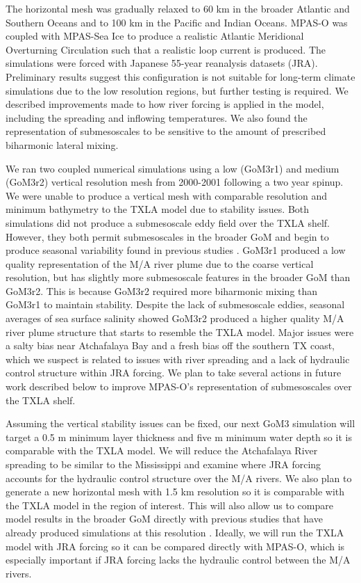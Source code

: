 The horizontal mesh was gradually relaxed to 60 km in the broader Atlantic and Southern Oceans and to 100 km in the Pacific and Indian Oceans. MPAS-O was coupled with MPAS-Sea Ice to produce a realistic Atlantic Meridional Overturning Circulation such that a realistic loop current is produced. The simulations were forced with Japanese 55-year reanalysis datasets (JRA). Preliminary results suggest this configuration is not suitable for long-term climate simulations due to the low resolution regions, but further testing is required. We described improvements made to how river forcing is applied in the model, including the spreading and inflowing temperatures. We also found the representation of submesoscales to be sensitive to the amount of prescribed biharmonic lateral mixing. 

We ran two coupled numerical simulations using a low (GoM3r1) and medium (GoM3r2) vertical resolution mesh from 2000-2001 following a two year spinup. We were unable to produce a vertical mesh with comparable resolution and minimum bathymetry to the TXLA model due to stability issues. Both simulations did not produce a submesoscale eddy field over the TXLA shelf. However, they both permit submesoscales in the broader GoM and begin to produce seasonal variability found in previous studies \citep{Barkan_2017, liu2021submesoscale}. GoM3r1 produced a low quality representation of the M/A river plume due to the coarse vertical resolution, but has slightly more submesoscale features in the broader GoM than GoM3r2. This is because GoM3r2 required more biharmonic mixing than GoM3r1 to maintain stability. Despite the lack of submesoscale eddies, seasonal averages of sea surface salinity showed GoM3r2 produced a higher quality M/A river plume structure that starts to resemble the TXLA model. Major issues were a salty bias near Atchafalaya Bay and a fresh bias off the southern TX coast, which we suspect is related to issues with river spreading and a lack of hydraulic control structure within JRA forcing. We plan to take several actions in future work described below to improve MPAS-O's representation of submesoscales over the TXLA shelf.

Assuming the vertical stability issues can be fixed, our next GoM3 simulation will target a 0.5 m minimum layer thickness and five m minimum water depth so it is comparable with the TXLA model. We will reduce the Atchafalaya River spreading to be similar to the Mississippi and examine where JRA forcing accounts for the hydraulic control structure over the M/A rivers. We also plan to generate a new horizontal mesh with 1.5 km resolution so it is comparable with the TXLA model in the region of interest. This will also allow us to compare model results in the broader GoM directly with previous studies that have already produced simulations at this resolution \citep{Barkan_2017, bracco2019mesoscale, liu2021submesoscale}. Ideally, we will run the TXLA model with JRA forcing so it can be compared directly with MPAS-O, which is especially important if JRA forcing lacks the hydraulic control between the M/A rivers. 

